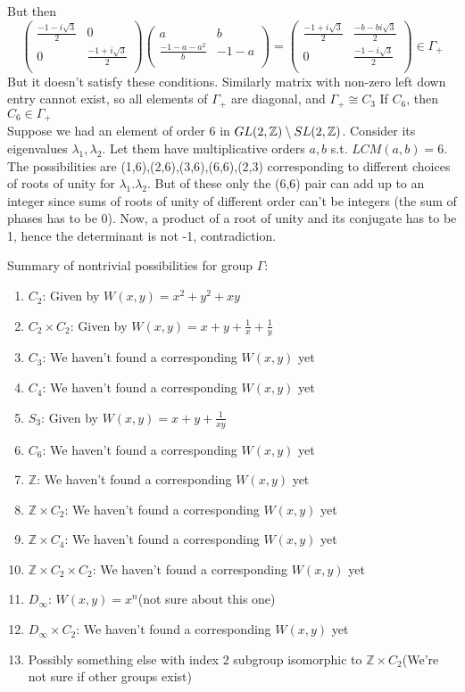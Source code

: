 \documentclass[a4paper]{article}
\begin{document}
But then 
$$\begin{pmatrix}
\frac{-1-i\sqrt{3}}{2} & 0 \\ 
0 &  \frac{-1+i\sqrt{3}}{2}\\
\end{pmatrix} \begin{pmatrix}
a & b \\ 
\frac{-1-a-a^2}{b} & -1-a \\
\end{pmatrix} = \begin{pmatrix}
\frac{-1+i\sqrt{3}}{2} & \frac{-b-b i\sqrt{3}}{2} \\ 
0 & \frac{-1-i\sqrt{3}}{2} \\
\end{pmatrix} \in \Gamma_+$$
But it doesn't satisfy these conditions.
Similarly matrix with non-zero left down entry cannot exist, so all elements of $\Gamma_+$ are diagonal, and $\Gamma_+ \cong C_3$
\clm If $C_6$\in \Gamma, then $C_6\in \Gamma_+$\\

Suppose we had an element of order 6 in $GL(2,\mathbb{Z})\setminus SL(2,\mathbb{Z})$. Consider its eigenvalues $\lambda_1,\lambda_2$. Let them have multiplicative orders $a,b$ s.t. $LCM(a,b)=6$. The possibilities are (1,6),(2,6),(3,6),(6,6),(2,3) corresponding to different choices of roots of unity for  $\lambda_1.\lambda_2$. But of these only the (6,6) pair can add up to an integer since sums of roots of unity of different order can't be integers (the sum of phases has to be 0). Now, a product of a root of unity and its conjugate has to be 1, hence the determinant is not -1, contradiction.
 
Summary of nontrivial possibilities for group $\Gamma$:
\begin{enumerate}
	\item $C_2$: Given by $W(x,y) = x^2 + y^2+ x y$ 
	\item $C_2 \times C_2$: Given by $W(x,y) = x+ y +\frac{1}{x}+\frac{1}{y}$
	\item $C_3$: We haven't found a corresponding $W(x,y)$ yet
	\item $C_4$: We haven't found a corresponding $W(x,y)$ yet
	\item $S_3$: Given by $W(x,y) = x + y +\frac{1}{xy}$
	\item $C_6$: We haven't found a corresponding $W(x,y)$ yet
	\item $\mathbb{Z}$: We haven't found a corresponding $W(x,y)$ yet
	\item $\mathbb{Z} \times C_2$: We haven't found a corresponding $W(x,y)$ yet
	\item $\mathbb{Z} \times C_4$: We haven't found a corresponding $W(x,y)$ yet
	\item $\mathbb{Z} \times C_2 \times C_2$: We haven't found a corresponding $W(x,y)$ yet
	\item $D_\infty$: $W(x,y) = x^n$(not sure about this one)
	\item $D_\infty \times C_2$: We haven't found a corresponding $W(x,y)$ yet
	\item Possibly something else with index 2 subgroup isomorphic to $\mathbb{Z} \times C_2$(We're not sure if other groups exist)
\end{enumerate}
\end{document}
